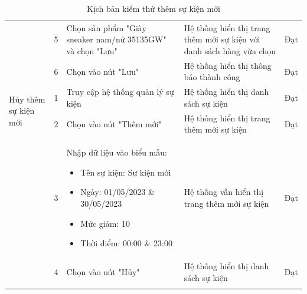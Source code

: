{\begin{longtable}{| p{2.5cm}| p{1cm}| p{5.5cm}| p{4.5cm} | p{1.5cm} |}
                                                     & 5                                            & Chọn sản phẩm "Giày sneaker nam/nử 35135GW" và chọn "Lưu" & Hệ thống hiển thị trang thêm mới sự kiện với danh sách hàng vừa chọn & Đạt             \\
        \cline{2-5}
                                                     & 6                                            & Chọn vào nút "Lưu"                                        & Hệ thống hiển thị thông báo thành công                               & Đạt             \\
        \hline
        \multirow[t]{2}{2.5cm}{Hủy thêm sự kiện mới} & 1                                            & Truy cập hệ thống quản lý sự kiện                         & Hệ thống hiển thị danh sách sự kiện                                  & Đạt             \\
        \cline{2-5}
                                                     & 2                                            & Chọn vào nút "Thêm mới"                                   & Hệ thống hiển thị trang thêm mới sự kiện                             & Đạt             \\
        \cline{2-5}
                                                     & 3                                            & Nhập dữ liệu vào biểu mẫu:
        \begin{itemize}
            \item Tên sự kiện: Sự kiện mới
            \item Ngày: 01/05/2023 \& 30/05/2023
            \item Mức giảm: 10
            \item Thời điểm: 00:00 \& 23:00
        \end{itemize}         & Hệ thống vẫn hiển thị trang thêm mới sự kiện & Đạt                                                                                                                                                                       \\
        \cline{2-5}
                                                     & 4                                            & Chọn vào nút "Hủy"                                        & Hệ thống hiển thị danh sách sự kiện                                  & Đạt             \\
        \hline
        \caption{Kịch bản kiểm thử thêm sự kiện mới}
    \end{longtable}
}


